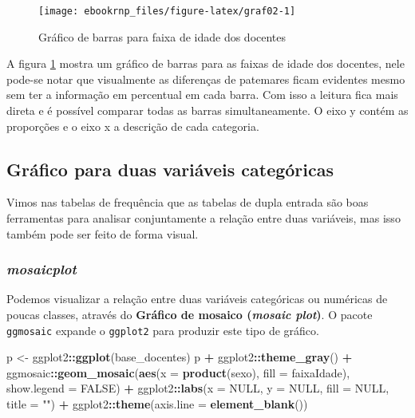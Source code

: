 \documentclass[12pt,]{style/krantz}
\makeatletter
\newenvironment{Shaded}{\begin{snugshade}}{\end{snugshade}}
\newcommand{\DataTypeTok}[1]{\textcolor[rgb]{0.13,0.29,0.53}{#1}}
\newcommand{\KeywordTok}[1]{\textcolor[rgb]{0.13,0.29,0.53}{\textbf{#1}}}
\newcommand{\NormalTok}[1]{#1}
\newcommand{\OperatorTok}[1]{\textcolor[rgb]{0.81,0.36,0.00}{\textbf{#1}}}
\newcommand{\OtherTok}[1]{\textcolor[rgb]{0.56,0.35,0.01}{#1}}
\newcommand{\StringTok}[1]{\textcolor[rgb]{0.31,0.60,0.02}{#1}}
\newenvironment{kframe}{%
\medskip{}
\setlength{\fboxsep}{.8em}
 \def\at@end@of@kframe{}%
 \ifinner\ifhmode%
  \def\at@end@of@kframe{\end{minipage}}%
  \begin{minipage}{\columnwidth}%
 \fi\fi%
 \def\FrameCommand##1{\hskip\@totalleftmargin \hskip-\fboxsep
 \colorbox{shadecolor}{##1}\hskip-\fboxsep
     \hskip-\linewidth \hskip-\@totalleftmargin \hskip\columnwidth}%
 \MakeFramed {\advance\hsize-\width
   \@totalleftmargin\z@ \linewidth\hsize
   \@setminipage}}%
 {\par\unskip\endMakeFramed%
 \at@end@of@kframe}
\renewenvironment{Shaded}{\begin{kframe}}{\end{kframe}}
\theoremstyle{definition}
\theoremstyle{definition}
\theoremstyle{definition}
\theoremstyle{remark}
\makeatother
\begin{document}
\begin{figure}[H]

{\centering \texttt{[image: ebookrnp\_files/figure-latex/graf02-1]} 

}

\caption{Gráfico de barras para faixa de idade dos docentes}\label{fig:graf02}
\end{figure}

A figura \ref{fig:graf02} mostra um gráfico de barras para as faixas de idade dos docentes, nele pode-se notar que visualmente as diferenças de patemares ficam evidentes mesmo sem ter a informação em percentual em cada barra. Com isso a leitura fica mais direta e é possível comparar todas as barras simultaneamente. O eixo y contém as proporções e o eixo x a descrição de cada categoria.

\hypertarget{grafico-para-duas-variaveis-categoricas}{%
\subsection{Gráfico para duas variáveis categóricas}\label{grafico-para-duas-variaveis-categoricas}}

Vimos nas tabelas de frequência que as tabelas de dupla entrada são boas ferramentas para analisar conjuntamente a relação entre duas variáveis, mas isso também pode ser feito de forma visual.

\hypertarget{mosaicplot}{%
\subsubsection{\texorpdfstring{\emph{mosaicplot}}{mosaicplot}}\label{mosaicplot}}

Podemos visualizar a relação entre duas variáveis categóricas ou numéricas de poucas classes, através do \textbf{Gráfico de mosaico (\emph{mosaic plot})}. O pacote \texttt{ggmosaic} expande o \texttt{ggplot2} para produzir este tipo de gráfico.

\begin{Shaded}
\begin{Highlighting}[]
\NormalTok{p <-}\StringTok{ }\NormalTok{ggplot2}\OperatorTok{::}\KeywordTok{ggplot}\NormalTok{(base_docentes)}
\NormalTok{p }\OperatorTok{+}\StringTok{ }\NormalTok{ggplot2}\OperatorTok{::}\KeywordTok{theme_gray}\NormalTok{() }\OperatorTok{+}
\StringTok{  }\NormalTok{ggmosaic}\OperatorTok{::}\KeywordTok{geom_mosaic}\NormalTok{(}\KeywordTok{aes}\NormalTok{(}\DataTypeTok{x =} \KeywordTok{product}\NormalTok{(sexo), }\DataTypeTok{fill =}\NormalTok{ faixaIdade), }
                        \DataTypeTok{show.legend =} \OtherTok{FALSE}\NormalTok{) }\OperatorTok{+}
\StringTok{  }\NormalTok{ggplot2}\OperatorTok{::}\KeywordTok{labs}\NormalTok{(}\DataTypeTok{x =} \OtherTok{NULL}\NormalTok{, }\DataTypeTok{y =} \OtherTok{NULL}\NormalTok{, }\DataTypeTok{fill =} \OtherTok{NULL}\NormalTok{, }\DataTypeTok{title =} \StringTok{""}\NormalTok{) }\OperatorTok{+}
\StringTok{  }\NormalTok{ggplot2}\OperatorTok{::}\KeywordTok{theme}\NormalTok{(}\DataTypeTok{axis.line =} \KeywordTok{element_blank}\NormalTok{())}
\end{Highlighting}
\end{Shaded}
\end{document}
